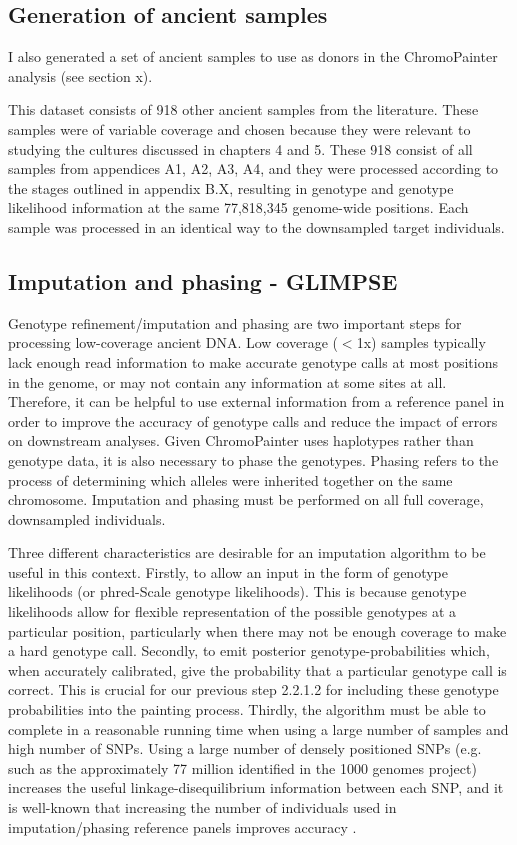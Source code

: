 \subsection{Generation of ancient samples} \label{AncientReferenceSamples}

I also generated a set of ancient samples to use as donors in the ChromoPainter analysis (see section x).

This dataset consists of 918 other ancient samples from the literature. These samples were of variable coverage and chosen because they were relevant to studying the cultures discussed in chapters 4 and 5. These 918 consist of all samples from appendices A1, A2, A3, A4, and they were processed according to the stages outlined in appendix B.X, resulting in genotype and genotype likelihood information at the same 77,818,345 genome-wide positions. Each  sample was processed in an identical way to the downsampled target individuals. 

\subsection{Imputation and phasing - GLIMPSE}

Genotype refinement/imputation and phasing are two important steps for processing low-coverage ancient DNA. Low coverage ($<$1x) samples typically lack enough read information to make accurate genotype calls at most positions in the genome, or may not contain any information at some sites at all. Therefore, it can be helpful to use external information from a reference panel in order to improve the accuracy of genotype calls and reduce the impact of errors on downstream analyses. Given ChromoPainter uses haplotypes rather than genotype data, it is also necessary to phase the genotypes. Phasing refers to the process of determining which alleles were inherited together on the same chromosome. Imputation and phasing must be performed on all full coverage, downsampled individuals. 

Three different characteristics are desirable for an imputation algorithm to be useful in this context. Firstly, to allow an input in the form of genotype likelihoods (or phred-Scale genotype likelihoods). This is because genotype likelihoods allow for flexible representation of the possible genotypes at a particular position, particularly when there may not be enough coverage to make a hard genotype call. Secondly, to emit posterior genotype-probabilities which, when accurately calibrated, give the probability that a particular genotype call is correct. This is crucial for our previous step 2.2.1.2 for including these genotype probabilities into the painting process. Thirdly, the algorithm must be able to complete in a reasonable running time when using a large number of samples and high number of SNPs. Using a large number of densely positioned SNPs (e.g. such as the approximately 77 million identified in the 1000 genomes project) increases the useful linkage-disequilibrium information between each SNP, and it is well-known that increasing the number of individuals used in imputation/phasing reference panels improves accuracy \cite{delaneau2018integrative, HUANG2009235, mccarthy2016reference, rubinacci2021efficient}. 

